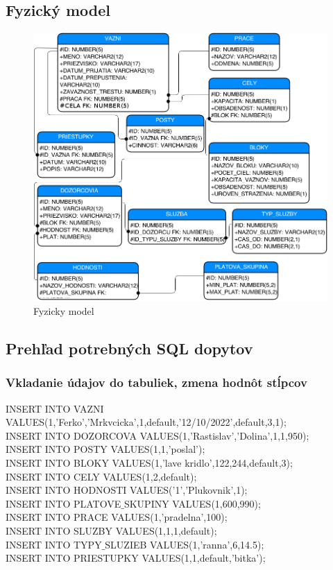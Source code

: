 \documentclass[slovak, 12pt, Times New Roman]{article}
\begin{document}
		\subsection{Fyzický model}
		\begin{figure}[!htb]
				\centering
				\includegraphics[scale=0.6]{fyzDia.png}
				\caption{Fyzicky model}
				\label{fig:Reinforcement}
			\end{figure}
		\clearpage
		\subsection{Prehľad potrebných SQL dopytov}
			\subsubsection{Vkladanie údajov do tabuliek, zmena hodnôt stĺpcov}
				INSERT INTO VAZNI VALUES(1,'Ferko','Mrkvcicka',1,default,'12/10/2022',default,3,1);\\
				INSERT INTO DOZORCOVA VALUES(1,'Rastislav','Dolina',1,1,950);\\
				INSERT INTO POSTY VALUES(1,1,'poslal');\\
				INSERT INTO BLOKY VALUES(1,'lave kridlo',122,244,default,3);\\
				INSERT INTO CELY VALUES(1,2,default);\\
				INSERT INTO HODNOSTI VALUES('1','Plukovnik',1);\\
				INSERT INTO PLATOVE$\_$SKUPINY VALUES(1,600,990);\\
				INSERT INTO PRACE VALUES(1,'pradelna',100);\\
				INSERT INTO SLUZBY VALUES(1,1,1,default);\\
				INSERT INTO TYPY$\_$SLUZIEB VALUES(1,'ranna',6,14.5);\\
				INSERT INTO PRIESTUPKY VALUES(1,1,default,'bitka');\\
\end{document}
